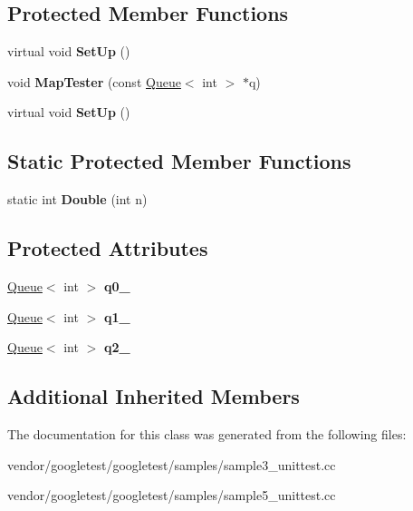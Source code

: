 \subsection*{Protected Member Functions}
\begin{DoxyCompactItemize}
\item 
\mbox{\label{class_queue_test_a91e69958f086239a523864d6b94ab174}} 
virtual void {\bfseries Set\+Up} ()
\item 
\mbox{\label{class_queue_test_a7f1661cd16c428a130d6ac1e4246eaab}} 
void {\bfseries Map\+Tester} (const \mbox{\hyperlink{class_queue}{Queue}}$<$ int $>$ $\ast$q)
\item 
\mbox{\label{class_queue_test_a91e69958f086239a523864d6b94ab174}} 
virtual void {\bfseries Set\+Up} ()
\end{DoxyCompactItemize}
\subsection*{Static Protected Member Functions}
\begin{DoxyCompactItemize}
\item 
\mbox{\label{class_queue_test_a2c7e0d1edb558dbbc4c085316d3d1ee6}} 
static int {\bfseries Double} (int n)
\end{DoxyCompactItemize}
\subsection*{Protected Attributes}
\begin{DoxyCompactItemize}
\item 
\mbox{\label{class_queue_test_a0eba1fe2b31d75abd2df688ca5245e22}} 
\mbox{\hyperlink{class_queue}{Queue}}$<$ int $>$ {\bfseries q0\+\_\+}
\item 
\mbox{\label{class_queue_test_a1e55594e71820ba0f1b09591fb328c30}} 
\mbox{\hyperlink{class_queue}{Queue}}$<$ int $>$ {\bfseries q1\+\_\+}
\item 
\mbox{\label{class_queue_test_aeb7a2e3f6ce2d97d84eb1e01468adc2f}} 
\mbox{\hyperlink{class_queue}{Queue}}$<$ int $>$ {\bfseries q2\+\_\+}
\end{DoxyCompactItemize}
\subsection*{Additional Inherited Members}


The documentation for this class was generated from the following files\+:\begin{DoxyCompactItemize}
\item 
vendor/googletest/googletest/samples/sample3\+\_\+unittest.\+cc\item 
vendor/googletest/googletest/samples/sample5\+\_\+unittest.\+cc\end{DoxyCompactItemize}
